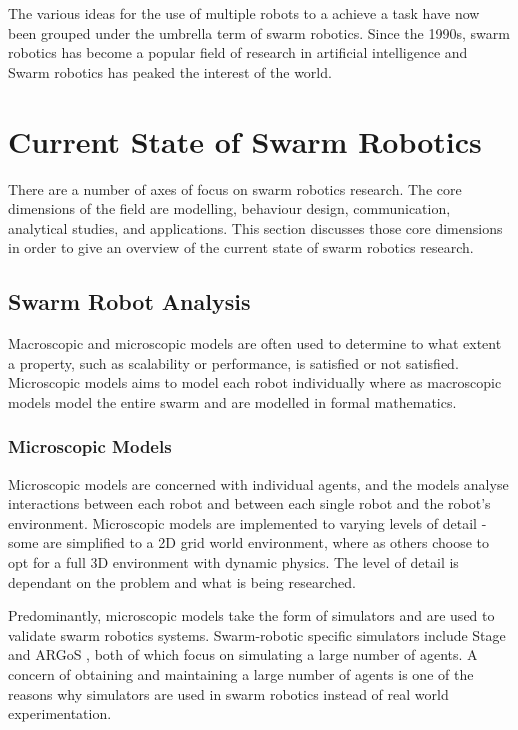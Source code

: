 The various ideas for the use of multiple robots to a achieve a task have now been grouped under the umbrella term of swarm robotics. Since the 1990s, swarm robotics has become a popular field of research in artificial intelligence and Swarm robotics has peaked the interest of the world. 


\section{Current State of Swarm Robotics}
\label{currentstate}

There are a number of axes of focus on swarm robotics research. The core dimensions of the field are modelling, behaviour design, communication, analytical studies, and applications. This section discusses those core dimensions in order to give an overview of the current state of swarm robotics research. 

\subsection{Swarm Robot Analysis}
Macroscopic and microscopic models are often used to determine to what extent a property, such as scalability or performance, is satisfied or not satisfied. Microscopic models aims to model each robot individually where as macroscopic models model the entire swarm and are modelled in formal mathematics.

\subsubsection{Microscopic Models}
\label{microscopicmodels}

Microscopic models are concerned with individual agents, and the models analyse interactions between each robot and between each single robot and the robot's environment. Microscopic models are implemented to varying levels of detail - some are simplified to a 2D grid world environment, where as others choose to opt for a full 3D environment with dynamic physics. The level of detail is dependant on the problem and what is being researched. 

Predominantly, microscopic models take the form of simulators and are used to validate swarm robotics systems. Swarm-robotic specific simulators include Stage \cite{vaughan2008massively} and ARGoS \cite{pinciroli2011argos}, both of which focus on simulating a large number of agents. A concern of obtaining and maintaining a large number of agents is one of the reasons why simulators are used in swarm robotics instead of real world experimentation.

